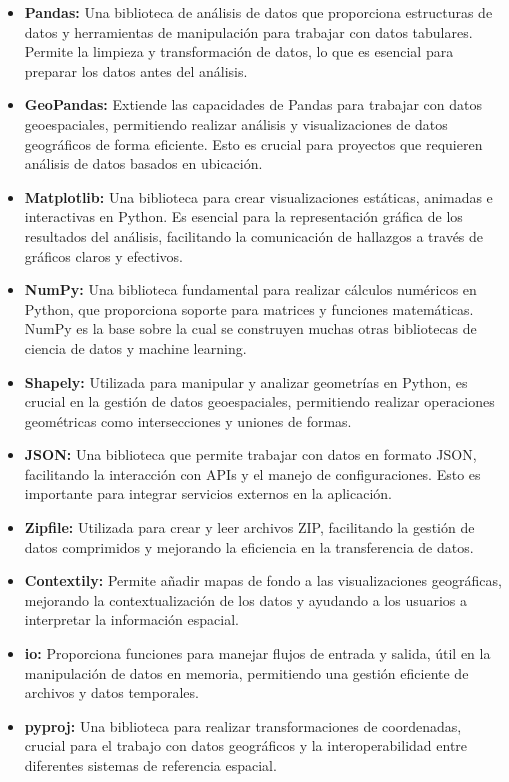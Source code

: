 \begin{itemize}
    \item \textbf{Pandas:} Una biblioteca de análisis de datos que proporciona estructuras de datos y herramientas de manipulación para trabajar con datos tabulares. Permite la limpieza y transformación de datos, lo que es esencial para preparar los datos antes del análisis.
    \item \textbf{GeoPandas:} Extiende las capacidades de Pandas para trabajar con datos geoespaciales, permitiendo realizar análisis y visualizaciones de datos geográficos de forma eficiente. Esto es crucial para proyectos que requieren análisis de datos basados en ubicación.
    \item \textbf{Matplotlib:} Una biblioteca para crear visualizaciones estáticas, animadas e interactivas en Python. Es esencial para la representación gráfica de los resultados del análisis, facilitando la comunicación de hallazgos a través de gráficos claros y efectivos.
    \item \textbf{NumPy:} Una biblioteca fundamental para realizar cálculos numéricos en Python, que proporciona soporte para matrices y funciones matemáticas. NumPy es la base sobre la cual se construyen muchas otras bibliotecas de ciencia de datos y machine learning.
    \item \textbf{Shapely:} Utilizada para manipular y analizar geometrías en Python, es crucial en la gestión de datos geoespaciales, permitiendo realizar operaciones geométricas como intersecciones y uniones de formas.
    \item \textbf{JSON:} Una biblioteca que permite trabajar con datos en formato JSON, facilitando la interacción con APIs y el manejo de configuraciones. Esto es importante para integrar servicios externos en la aplicación.
    \item \textbf{Zipfile:} Utilizada para crear y leer archivos ZIP, facilitando la gestión de datos comprimidos y mejorando la eficiencia en la transferencia de datos.
    \item \textbf{Contextily:} Permite añadir mapas de fondo a las visualizaciones geográficas, mejorando la contextualización de los datos y ayudando a los usuarios a interpretar la información espacial.
    \item \textbf{io:} Proporciona funciones para manejar flujos de entrada y salida, útil en la manipulación de datos en memoria, permitiendo una gestión eficiente de archivos y datos temporales.
    \item \textbf{pyproj:} Una biblioteca para realizar transformaciones de coordenadas, crucial para el trabajo con datos geográficos y la interoperabilidad entre diferentes sistemas de referencia espacial.

\end{itemize}
